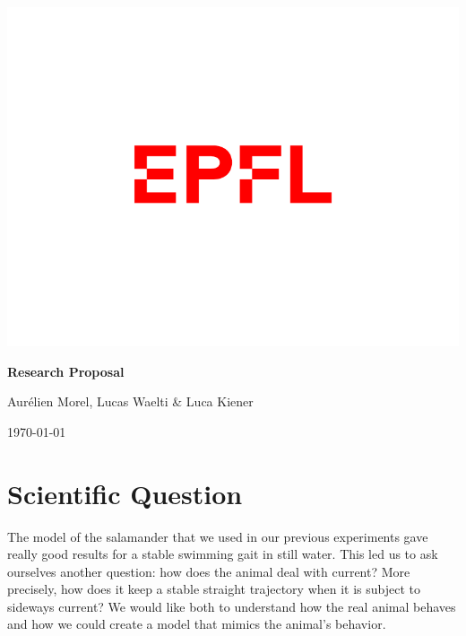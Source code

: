\documentclass{article}
\begin{document}
\begin{titlepage}
\begin{center}
\vspace{1cm}
\includegraphics[scale=0.5]{Logo_EPFL.png}\par
\vspace{4cm}

{\Huge \bf Research Proposal \par}




\vspace{3cm}

{\large Aurélien Morel, Lucas Waelti \& Luca Kiener}\par
\vspace{2cm}

\today


\vfill
\end{center}
\end{titlepage}

\section{Scientific Question}
The model of the salamander that we used in our previous experiments gave really good results for a stable swimming gait in still water. This led us to ask ourselves another question: how does the animal deal with current? More precisely, how does it keep a stable straight trajectory when it is subject to sideways current? We would like both to understand how the real animal behaves and how we could create a model that mimics the animal's behavior. 
\end{document}
